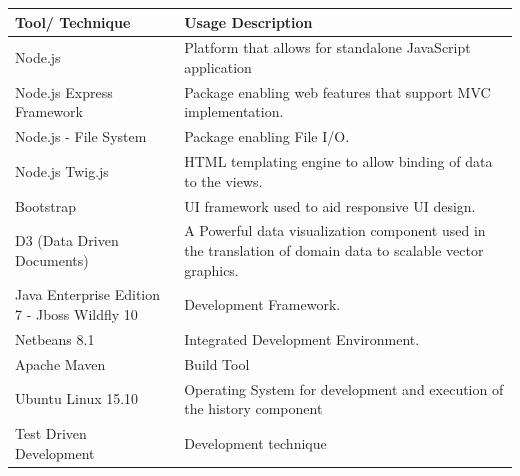 \documentclass[12pt]{article} %
\begin{document}
	 
\begin{center}
	 \begin{tabular}{ | p{3.5cm} | p{12cm} |}
		\hline
	 	\textbf{Tool/ Technique} & \textbf{Usage Description} \\
		\hline
	 	Node.js & Platform that allows for standalone JavaScript application\\
	 	\hline
	 	Node.js Express Framework & Package enabling web features that support MVC implementation.\\
	 	\hline
	 	Node.js - File System & Package enabling File I/O.\\
	 	\hline
	 	Node.js Twig.js & HTML templating engine to allow binding of data to the views.\\
	 	\hline
	 	Bootstrap & UI framework used to aid responsive UI design.\\
	 	\hline
	 	D3 (Data Driven Documents) & A Powerful data visualization component used in the translation of domain data to scalable vector graphics.\\
	 	\hline
	 	Java Enterprise Edition 7 - Jboss Wildfly 10 & Development Framework.\\
	 	\hline
	 	Netbeans 8.1 & Integrated Development Environment.\\
	 	\hline
	 	Apache Maven & Build Tool\\
	 	\hline
	 	Ubuntu Linux 15.10 & Operating System for development and execution of the history component\\
	 	\hline
	 	Test Driven Development & Development technique\\
	 	\hline
	 	\end{tabular}
	\end{center}
		 
	
\end{document}
